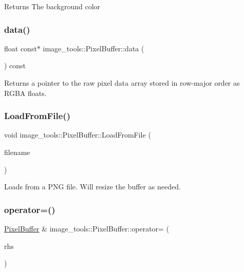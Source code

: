 \begin{DoxyReturn}{Returns}
The background color 
\end{DoxyReturn}
\mbox{\label{classimage__tools_1_1PixelBuffer_a8f7b9f293b7ac93f8c33f75f50ce5a7b}} 
\subsubsection{\texorpdfstring{data()}{data()}}
{\footnotesize\ttfamily float const$\ast$ image\+\_\+tools\+::\+Pixel\+Buffer\+::data (\begin{DoxyParamCaption}{ }\end{DoxyParamCaption}) const\hspace{0.3cm}{\ttfamily [inline]}}

Returns a pointer to the raw pixel data array stored in row-\/major order as R\+G\+BA floats. \mbox{\label{classimage__tools_1_1PixelBuffer_aaa5f861df2ec901617aadeb5016bdf1e}} 
\subsubsection{\texorpdfstring{Load\+From\+File()}{LoadFromFile()}}
{\footnotesize\ttfamily void image\+\_\+tools\+::\+Pixel\+Buffer\+::\+Load\+From\+File (\begin{DoxyParamCaption}\item[{const std\+::string \&}]{filename }\end{DoxyParamCaption})}

Loads from a P\+NG file. Will resize the buffer as needed. \mbox{\label{classimage__tools_1_1PixelBuffer_a95f63d0b72c4d0b371c556597cf77578}} 
\subsubsection{\texorpdfstring{operator=()}{operator=()}}
{\footnotesize\ttfamily \hyperlink{classimage__tools_1_1PixelBuffer}{Pixel\+Buffer} \& image\+\_\+tools\+::\+Pixel\+Buffer\+::operator= (\begin{DoxyParamCaption}\item[{const \hyperlink{classimage__tools_1_1PixelBuffer}{Pixel\+Buffer} \&}]{rhs }\end{DoxyParamCaption})}

